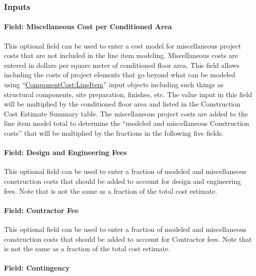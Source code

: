 \subsubsection{Inputs}

\paragraph{Field: Miscellaneous Cost per Conditioned Area}\label{field-miscellaneous-cost-per-conditioned-area}

This optional field can be used to enter a cost model for miscellaneous project costs that are not included in the line item modeling. Miscellaneous costs are entered in dollars per square meter of conditioned floor area. This field allows including the costs of project elements that go beyond what can be modeled using ``\hyperref[componentcostlineitem]{ComponentCost:LineItem}'' input objects including such things as structural components, site preparation, finishes, etc. The value input in this field will be multiplied by the conditioned floor area and listed in the Construction Cost Estimate Summary table. The miscellaneous project costs are added to the line item model total to determine the ``modeled and miscellaneous Construction costs'' that will be multiplied by the fractions in the following five fields.

\paragraph{Field: Design and Engineering Fees}\label{field-design-and-engineering-fees}

This optional field can be used to enter a fraction of modeled and miscellaneous construction costs that should be added to account for design and engineering fees. Note that is not the same as a fraction of the total cost estimate.

\paragraph{Field: Contractor Fee}\label{field-contractor-fee}

This optional field can be used to enter a fraction of modeled and miscellaneous construction costs that should be added to account for Contractor fees. Note that is not the same as a fraction of the total cost estimate.

\paragraph{Field: Contingency}\label{field-contingency}

